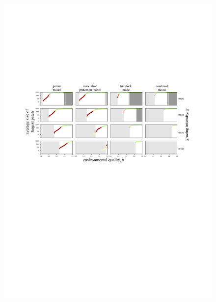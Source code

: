 \begin{figure}[h]%
\includegraphics[width=\columnwidth]{figures/fig4.pdf}%
\caption{}%
\label{}%
\end{figure}

